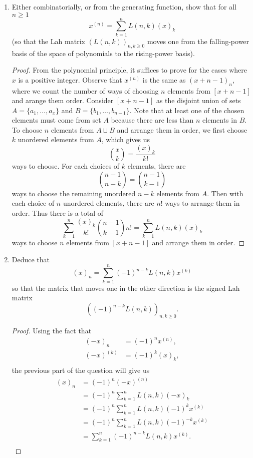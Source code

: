 \documentclass{article}
\begin{document}
\begin{enumerate}[label={(\alph*)}]
    \item Either combinatorially, or from the generating function, show
      that for all $n\geq1$
      \[x^{(n)} =\sum_{k=1}^n L(n,k)(x)_k\]
      (so that the Lah matrix $(L(n,k))_{n,k\geq0}$ moves one from the
      falling-power basis of the space of polynomials to the rising-power
      basis).

      \begin{proof}
        From the polynomial principle, it suffices to prove for the cases
        where $x$ is a positive integer.  Observe that $x^{(n)}$ is the
        same as $(x+n-1)_n$, where we count the number of ways of choosing
        $n$ elements from $[x+n-1]$ and arange them order. Consider
        $[x+n-1]$ as the disjoint union of sets $A=\{a_1,\ldots,a_{x}\}$
        and $B=\{b_1,\ldots,b_{n-1}\}$. Note that at least one of the chosen
        elements must come from set $A$ because there are less than $n$
        elements in $B$. \\

        To choose $n$ elements from $A\sqcup B$ and arrange them in order,
        we first choose $k$ unordered elements from $A$, which gives us
        \[\binom{x}{k} =\frac{(x)_k}{k!}\]
        ways to choose. For each choices of $k$ elements, there are
        \[\binom{n-1}{n-k} =\binom{n-1}{k-1}\]
        ways to choose the remaining unordered $n-k$ elements from $A$.
        Then with each choice of $n$ unordered elements, there are $n!$
        ways to arrange them in order. Thus there is a total of
        \[\sum_{k=1}^n \frac{(x)_k}{k!}\binom{n-1}{k-1} n! =\sum_{k=1}^n
        L(n,k)(x)_k\]
        ways to choose $n$ elements from $[x+n-1]$ and arrange them in
        order.
      \end{proof}

    \item Deduce that
      \[(x)_n =\sum_{k=1}^n (-1)^{n-k} L(n,k)x^{(k)}\]
      so that the matrix that moves one in the other direction is the
      signed Lah matrix
      \[((-1)^{n-k} L(n,k))_{n,k\geq0}.\]

      \begin{proof}
        Using the fact that
        \begin{align*}
          (-x)_n &=(-1)^nx^{(n)},\\
          (-x)^{(k)} &=(-1)^k(x)_k,\\
        \end{align*}
        the previous part of the question will give us
        \begin{align*}
          (x)_n &=(-1)^n (-x)^{(n)}\\
          &=(-1)^n \sum_{k=1}^n L(n,k) (-x)_{k}\\
          &=(-1)^n \sum_{k=1}^n L(n,k) (-1)^{k} x^{(k)}\\
          &=(-1)^n \sum_{k=1}^n L(n,k) (-1)^{-k} x^{(k)}\\
          &=\sum_{k=1}^n (-1)^{n-k} L(n,k) x^{(k)}.\\
        \end{align*}
      \end{proof}
  \end{enumerate}
\end{document}
